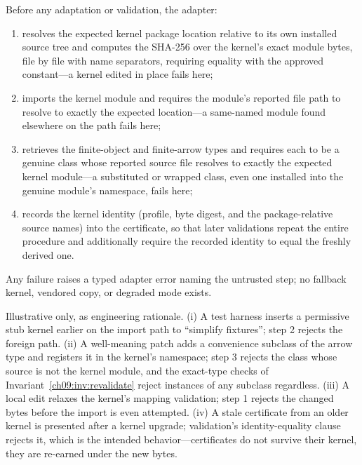 \begin{protocol}\label{ch09:pro:kernel}
Before any adaptation or validation, the adapter:
\begin{enumerate}
\item resolves the expected kernel package location relative to its own installed source tree and computes the SHA-256 over the kernel's exact module bytes, file by file with name separators, requiring equality with the approved constant---a kernel edited in place fails here;
\item imports the kernel module and requires the module's reported file path to resolve to exactly the expected location---a same-named module found elsewhere on the path fails here;
\item retrieves the finite-object and finite-arrow types and requires each to be a genuine class whose reported source file resolves to exactly the expected kernel module---a substituted or wrapped class, even one installed into the genuine module's namespace, fails here;
\item records the kernel identity (profile, byte digest, and the package-relative source names) into the certificate, so that later validations repeat the entire procedure and additionally require the recorded identity to equal the freshly derived one.
\end{enumerate}
Any failure raises a typed adapter error naming the untrusted step; no fallback kernel, vendored copy, or degraded mode exists.
\end{protocol}

\begin{threat}\label{ch09:thr:substitution}
Illustrative only, as engineering rationale. (i) A test harness inserts a permissive stub kernel earlier on the import path to ``simplify fixtures''; step 2 rejects the foreign path. (ii) A well-meaning patch adds a convenience subclass of the arrow type and registers it in the kernel's namespace; step 3 rejects the class whose source is not the kernel module, and the exact-type checks of Invariant~\ref{ch09:inv:revalidate} reject instances of any subclass regardless. (iii) A local edit relaxes the kernel's mapping validation; step 1 rejects the changed bytes before the import is even attempted. (iv) A stale certificate from an older kernel is presented after a kernel upgrade; validation's identity-equality clause rejects it, which is the intended behavior---certificates do not survive their kernel, they are re-earned under the new bytes.
\end{threat}

